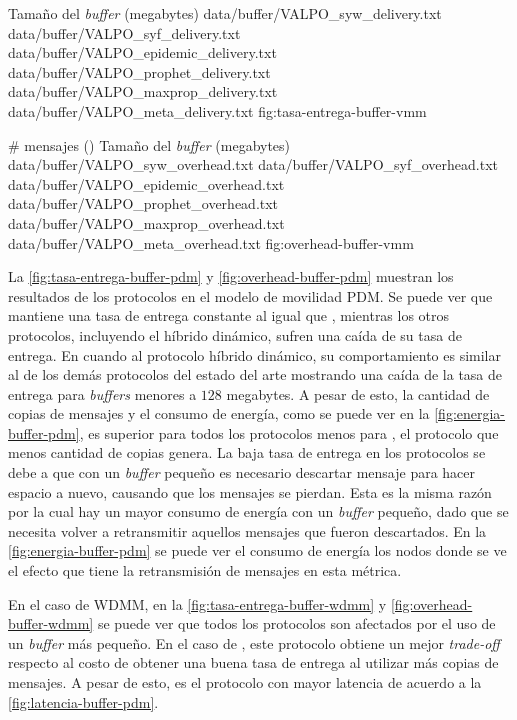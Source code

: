 {
\graficoDeliveryProtocolos
{Tamaño del \textit{buffer} (megabytes)}
{data/buffer/VALPO_syw_delivery.txt}
{data/buffer/VALPO_syf_delivery.txt}
{data/buffer/VALPO_epidemic_delivery.txt}
{data/buffer/VALPO_prophet_delivery.txt}
{data/buffer/VALPO_maxprop_delivery.txt}
{data/buffer/VALPO_meta_delivery.txt}
}{fig:tasa-entrega-buffer-vmm}

{
\graficoProtocolos
{\# mensajes (\overhead)}
{Tamaño del \textit{buffer} (megabytes)}
{data/buffer/VALPO_syw_overhead.txt}
{data/buffer/VALPO_syf_overhead.txt}
{data/buffer/VALPO_epidemic_overhead.txt}
{data/buffer/VALPO_prophet_overhead.txt}
{data/buffer/VALPO_maxprop_overhead.txt}
{data/buffer/VALPO_meta_overhead.txt}
}{fig:overhead-buffer-vmm}


La \ref{fig:tasa-entrega-buffer-pdm} y 
\ref{fig:overhead-buffer-pdm} muestran los resultados de los protocolos en el
modelo de movilidad PDM. Se puede ver que \maxprop{} mantiene una tasa de
entrega constante al igual que \syw, mientras los otros protocolos, incluyendo
el híbrido dinámico, sufren una caída de su tasa de entrega. En cuando al
protocolo híbrido dinámico, su comportamiento es similar al de los demás
protocolos del estado del arte mostrando una caída de la tasa de entrega para
\textit{buffers} menores a $128$ megabytes. A pesar de esto, la cantidad de
copias de mensajes y el consumo de energía, como se puede ver en la
\ref{fig:energia-buffer-pdm}, es superior para todos los protocolos menos para
\syw, el protocolo que menos cantidad de copias genera. La baja tasa de entrega
en los protocolos se debe a que con un \textit{buffer} pequeño es necesario
descartar mensaje para hacer espacio a nuevo, causando que los mensajes se
pierdan. Esta es la misma razón por la cual hay un mayor consumo de energía con
un \textit{buffer} pequeño, dado que se necesita volver a retransmitir aquellos
mensajes que fueron descartados. En la \ref{fig:energia-buffer-pdm} se puede ver
el consumo de energía los nodos donde se ve el efecto que tiene la retransmisión
de mensajes en esta métrica.


En el caso de WDMM, en la \ref{fig:tasa-entrega-buffer-wdmm} y
\ref{fig:overhead-buffer-wdmm} se puede ver que todos los protocolos son
afectados por el uso de un \textit{buffer} más pequeño. En el caso de \syf, este
protocolo obtiene un mejor \textit{trade-off} respecto al costo de obtener una
buena tasa de entrega al utilizar más copias de mensajes. A pesar de esto,
\syf{} es el protocolo con mayor latencia de acuerdo a la
\ref{fig:latencia-buffer-pdm}.

